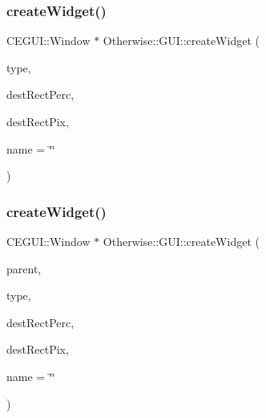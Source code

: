 \subsubsection{\texorpdfstring{create\+Widget()}{createWidget()}\hspace{0.1cm}{\footnotesize\ttfamily [1/2]}}
{\footnotesize\ttfamily C\+E\+G\+U\+I\+::\+Window $\ast$ Otherwise\+::\+G\+U\+I\+::create\+Widget (\begin{DoxyParamCaption}\item[{const std\+::string \&}]{type,  }\item[{const glm\+::vec4 \&}]{dest\+Rect\+Perc,  }\item[{const glm\+::vec4 \&}]{dest\+Rect\+Pix,  }\item[{const std\+::string \&}]{name = {\ttfamily \char`\"{}\char`\"{}} }\end{DoxyParamCaption})}

\mbox{\label{class_otherwise_1_1_g_u_i_a147e9f8adc6d75ff4d04e10f708398b6}} 
\subsubsection{\texorpdfstring{create\+Widget()}{createWidget()}\hspace{0.1cm}{\footnotesize\ttfamily [2/2]}}
{\footnotesize\ttfamily C\+E\+G\+U\+I\+::\+Window $\ast$ Otherwise\+::\+G\+U\+I\+::create\+Widget (\begin{DoxyParamCaption}\item[{C\+E\+G\+U\+I\+::\+Window $\ast$}]{parent,  }\item[{const std\+::string \&}]{type,  }\item[{const glm\+::vec4 \&}]{dest\+Rect\+Perc,  }\item[{const glm\+::vec4 \&}]{dest\+Rect\+Pix,  }\item[{const std\+::string \&}]{name = {\ttfamily \char`\"{}\char`\"{}} }\end{DoxyParamCaption})}

\mbox{\label{class_otherwise_1_1_g_u_i_a4f90a71192bc9b839817e4fea43daf90}} 
